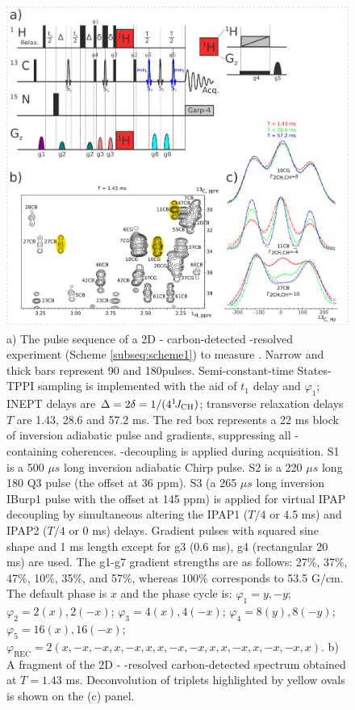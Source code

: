 \documentclass[twocolumn]{svjour3}           %
\begin{document}
\begin{figure}
 \includegraphics[width=1.0\textwidth]{Fig1.pdf}
 \caption{
 a) The pulse sequence of a 2D \hlab-\clab{} carbon-detected 
 \oneJch-resolved experiment (Scheme \ref{subseq:scheme1}) 
 to measure \gtwoCH{}. Narrow and thick bars represent 90\degree 
 and 180\degree pulses. Semi-constant-time \hlab{} States-{TPPI} 
 sampling is implemented with the aid of $t_1$ delay and 
 $\varphi_1$; {INEPT} delays are $\Delta = 2\delta = 1/(4^1\!J_\text{CH})$; 
 transverse relaxation delays $T$ are 1.43, 28.6 and 57.2 ms. 
 The red box represents a 22 ms block of \hlab{} inversion adiabatic pulse and gradients\cite{thrippleton_elimination_2003,harris_zero-quantum_2011}, suppressing all \hlab-containing coherences. 
 \nlab-decoupling is applied during acquisition. 
 S1 is a 500 $\mu s$ long \clab{} inversion adiabatic Chirp pulse. 
 S2 is a 220 $\mu s$ long 180\degree{} Q3 pulse (the offset at 36 ppm). 
 S3 (a 265 $\mu s$ long inversion IBurp1 pulse with the offset 
 at 145 ppm) is applied for virtual IPAP decoupling by simultaneous 
 altering the IPAP1 ($T/4$ or 4.5 ms) and IPAP2 ($T/4$ or 0 ms) 
 delays. Gradient pulses with squared sine shape and 1 ms length 
 except for g3 (0.6 ms), g4 (rectangular 20 ms) are used. 
 The g1-g7 gradient strengths are as follows: 27\%, 37\%, 47\%, 10\%, 35\%, and 57\%, whereas 100\% corresponds to 53.5 G/cm.
 The default phase is $x$ and the phase cycle is: 
 $\varphi_1 = y, -y$; 
 $\varphi_2 = 2(x), 2(-x)$; 
 $\varphi_3 = 4(x), 4(-x)$; 
 $\varphi_4 = 8(y), 8(-y)$; 
 $\varphi_5 = 16(x), 16(-x)$; 
 $\varphi_\text{REC} = 2(x, -x, -x, x, -x, x, x, -x, -x, x, x, -x, x, -x, -x, x)$. 
 b) A fragment of the 2D \hlab-\clab{} \oneJch-resolved carbon-detected 
 spectrum obtained at $T = 1.43$ ms. 
 Deconvolution of triplets highlighted  by yellow ovals is shown on 
 the (c) panel.
 }
 \label{fig:scheme1}
\end{figure}
\end{document}

